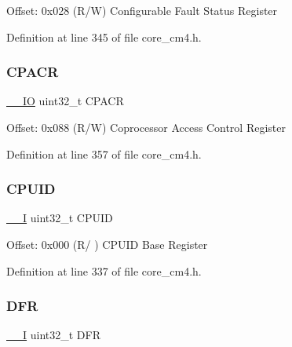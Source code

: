 Offset\+: 0x028 (R/W) Configurable Fault Status Register 

Definition at line 345 of file core\+\_\+cm4.\+h.

\mbox{\label{struct_s_c_b___type_acccaf5688449c8253e9952ddc2161528}} 
\subsubsection{\texorpdfstring{C\+P\+A\+CR}{CPACR}}
{\footnotesize\ttfamily \hyperlink{group___c_m_s_i_s__core__definitions_gaec43007d9998a0a0e01faede4133d6be}{\+\_\+\+\_\+\+IO} uint32\+\_\+t C\+P\+A\+CR}

Offset\+: 0x088 (R/W) Coprocessor Access Control Register 

Definition at line 357 of file core\+\_\+cm4.\+h.

\mbox{\label{struct_s_c_b___type_a30abfea43143a424074f682bd61eace0}} 
\subsubsection{\texorpdfstring{C\+P\+U\+ID}{CPUID}}
{\footnotesize\ttfamily \hyperlink{group___c_m_s_i_s__core__definitions_gaf63697ed9952cc71e1225efe205f6cd3}{\+\_\+\+\_\+I} uint32\+\_\+t C\+P\+U\+ID}

Offset\+: 0x000 (R/ ) C\+P\+U\+ID Base Register 

Definition at line 337 of file core\+\_\+cm4.\+h.

\mbox{\label{struct_s_c_b___type_a1b9a71780ae327f1f337a2176b777618}} 
\subsubsection{\texorpdfstring{D\+FR}{DFR}}
{\footnotesize\ttfamily \hyperlink{group___c_m_s_i_s__core__definitions_gaf63697ed9952cc71e1225efe205f6cd3}{\+\_\+\+\_\+I} uint32\+\_\+t D\+FR}

